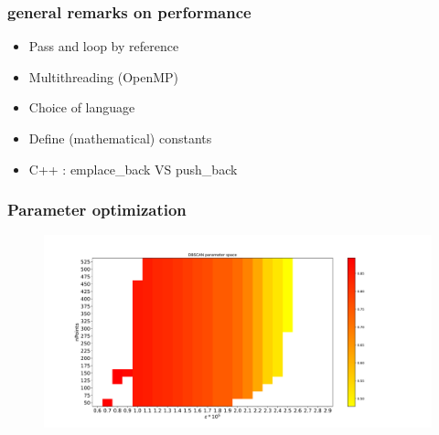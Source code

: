 \documentclass{beamer}
\begin{document}
\begin{frame}
\frametitle{general remarks on performance}
\begin{itemize}
\item Pass and loop by reference
\item Multithreading (OpenMP)
\item Choice of language
\item Define (mathematical) constants
\item C++ : emplace\_back VS push\_back
\end{itemize}
\end{frame}

\begin{frame}
\frametitle{Parameter optimization}
\begin{figure}
\centering
\includegraphics[width=\textwidth,height=\textheight,keepaspectratio]{Images/DBSCAN_parameter_space.pdf}
\end{figure}
\end{frame}
\end{document}

